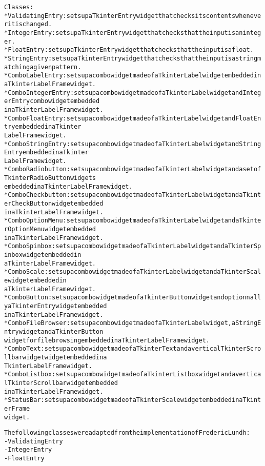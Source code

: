 \begin{alltt}
Classes:
    * ValidatingEntry   : sets up a Tkinter Entry widget that checks its contents whenever it is changed.
    * IntegerEntry      : sets up a Tkinter Entry widget that checks that the input is an integer.
    * FloatEntry        : sets up a Tkinter Entry widget that checks that the input is a float.
    * StringEntry       : sets up a Tkinter Entry widget that checks that the input is a string matching a given pattern.
    * ComboLabelEntry   : sets up a combo widget made of a Tkinter Label widget embedded in a Tkinter LabelFrame widget.
    * ComboIntegerEntry : sets up a combo widget made of a Tkinter Label widget and IntegerEntry combo widget embedded 
      in a Tkinter LabelFrame widget.
    * ComboFloatEntry   : sets up a combo widget made of a Tkinter Label widget and FloatEntry embedded in a Tkinter 
      LabelFrame widget.
    * ComboStringEntry  : sets up a combo widget made of a Tkinter Label widget and StringEntry embedded in a Tkinter 
      LabelFrame widget.
    * ComboRadiobutton  : sets up a combo widget made of a Tkinter Label widget and a set of Tkinter RadioButton widgets 
      embedded in a Tkinter LabelFrame widget.
    * ComboCheckbutton  : sets up a combo widget made of a Tkinter Label widget and a Tkinter CheckButton widget embedded 
      in a Tkinter LabelFrame widget.
    * ComboOptionMenu   : sets up a combo widget made of a Tkinter Label widget and a Tkinter OptionMenu widget embedded 
      in a Tkinter LabelFrame widget.
    * ComboSpinbox      : sets up a combo widget made of a Tkinter Label widget and a Tkinter Spinbox widget embedded in 
      a Tkinter LabelFrame widget.
    * ComboScale        : sets up a combo widget made of a Tkinter Label widget and a Tkinter Scale widget embedded in 
      a Tkinter LabelFrame widget.
    * ComboButton       : sets up a combo widget made of a Tkinter Button widget and optionnally a Tkinter Entry widget embedded 
      in a Tkinter LabelFrame widget.
    * ComboFileBrowser  : sets up a combo widget made of a Tkinter Label widget, a StringEntry widget and a Tkinter Button 
      widget for file browsing embedded in a Tkinter LabelFrame widget.
    * ComboText         : sets up a combo widget made of a Tkinter Text and a vertical Tkinter Scrollbar widget widget embedded in a 
      Tkinter LabelFrame widget.
    * ComboListbox      : sets up a combo widget made of a Tkinter Listbox widget and a vertical Tkinter Scrollbar widget embedded 
      in a Tkinter LabelFrame widget.
    * StatusBar         : sets up a combo widget made of a Tkinter Scale widget embedded in a Tkinter Frame 
      widget.


The following classes were adapted from the implementation of Frederic Lundh:
    - ValidatingEntry
    - IntegerEntry
    - FloatEntry
\end{alltt}


